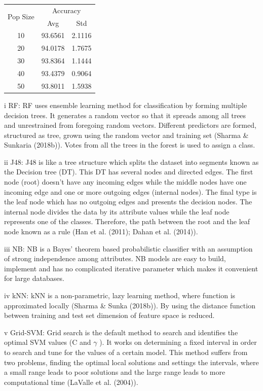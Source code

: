 \documentclass{article}
\begin{document}
\begin{tabular}{|c|c|c|}\hline
\multirow{2}{*}{Pop Size} & \multicolumn{2}{|c|}{Accuracy} \\ \cline{2-3}
  & Avg & Std \\ \hline
10 & 93.6561 & 2.1116 \\ \hline
20 & 94.0178 & 1.7675 \\ \hline
30 & 93.8364 & 1.1444 \\ \hline
40 & 93.4379 & 0.9064 \\ \hline
50 & 93.8011 & 1.5938 \\ \hline
\end{tabular}
i RF: RF uses ensemble learning method for classification by forming multiple decision trees. It generates a random vector so that it spreads among all trees and unrestrained from foregoing random vectors. Different predictors are formed, structured as tree, grown using the random vector and training set (Sharma & Sunkaria (2018b)). Votes from all the trees in the forest is used to assign a class.


ii J48: J48 is like a tree structure which splits the dataset into segments known as the Decision tree (DT). This DT has several nodes and directed edges. The first node (root) doesn’t have any incoming edges while the middle nodes have one incoming edge and one or more outgoing edges (internal nodes). The final type is the leaf node which has no outgoing edges and presents the decision nodes. The internal node divides the data by its attribute values while the leaf node represents one of the classes. Therefore, the path between the root and the leaf node known as a rule (Han et al. (2011); Dahan et al. (2014)).


iii NB: NB is a Bayes’ theorem based probabilistic classifier with an assumption of strong independence among attributes. NB models are easy to build, implement and has no complicated iterative parameter which makes it convenient for large databases.


iv kNN: kNN is a non-parametric, lazy learning method, where function is approximated locally (Sharma & Sunka (2018b)). By using the distance function between training and test set dimension of feature space is reduced.


v Grid-SVM: Grid search is the default method to search and identifies the optimal SVM values (C and $\gamma$ ). It works on determining a fixed interval in order to search and tune for the values of a certain model. This method suffers from two problems, finding the optimal local solutions and settings the intervals, where a small range leads to poor solutions and the large range leads to more computational time (LaValle et al. (2004)).
\end{document}
